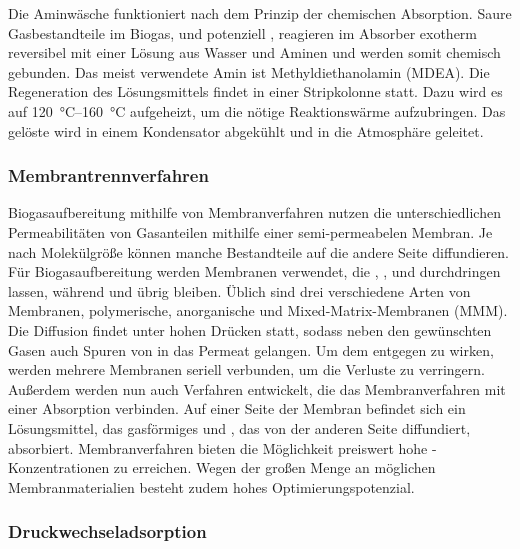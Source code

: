 Die Aminwäsche funktioniert nach dem Prinzip der chemischen Absorption. Saure Gasbestandteile im Biogas,  und potenziell , reagieren im Absorber exotherm reversibel mit einer Lösung aus Wasser und Aminen und werden somit chemisch gebunden. Das meist verwendete Amin ist Methyldiethanolamin (MDEA). Die Regeneration des Lösungsmittels findet in einer Stripkolonne statt. Dazu wird es auf \SIrange{120}{160}{\degreeCelsius} aufgeheizt, um die nötige Reaktionswärme aufzubringen. Das gelöste  wird in einem Kondensator abgekühlt und in die Atmosphäre geleitet. \parencite{BHPT13} \parencite{KGKK2019}


\subsubsection{Membrantrennverfahren}\label{chap:membrane} 

Biogasaufbereitung mithilfe von Membranverfahren nutzen die unterschiedlichen Permeabilitäten von Gasanteilen mithilfe einer semi-permeabelen Membran. Je nach Molekülgröße können manche Bestandteile auf die andere Seite diffundieren. Für Biogasaufbereitung werden Membranen verwendet, die , ,  und  durchdringen lassen, während  und  übrig bleiben. Üblich sind drei verschiedene Arten von Membranen, polymerische, anorganische und Mixed-Matrix-Membranen (MMM). Die Diffusion findet unter hohen Drücken statt, sodass neben den gewünschten Gasen auch Spuren von  in das Permeat gelangen. Um dem entgegen zu wirken, werden mehrere Membranen seriell verbunden, um die Verluste zu verringern. Außerdem werden nun auch Verfahren entwickelt, die das Membranverfahren mit einer Absorption verbinden. Auf einer Seite der Membran befindet sich ein Lösungsmittel, das gasförmiges  und , das von der anderen Seite diffundiert, absorbiert. Membranverfahren bieten die Möglichkeit preiswert hohe -Konzentrationen zu erreichen. Wegen der großen Menge an möglichen Membranmaterialien besteht zudem hohes Optimierungspotenzial. \parencite{KGKK2019}


\subsubsection{Druckwechseladsorption}\label{chap:PSA}

